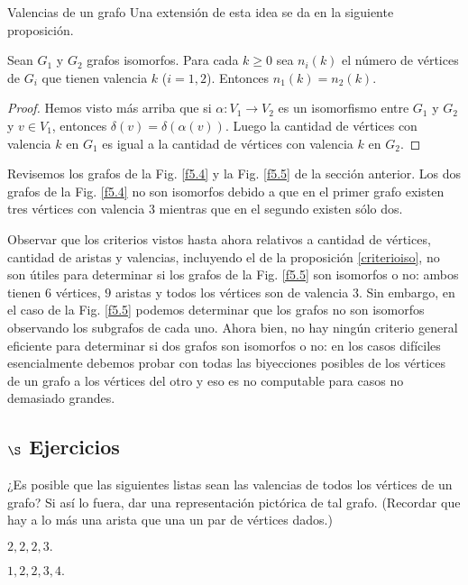 \begin{section}{Valencias de un grafo}
Una extensión de esta idea se da en la siguiente proposición.

\begin{proposicion}\label{criterioiso}Sean  $G_1$ y $G_2$ grafos isomorfos. Para cada $k\ge 0$ sea $n_i(k)$ el número de vértices de $G_i$ que tienen valencia $k$ ($i=1,2$). Entonces $n_1(k)=n_2(k)$.
\end{proposicion}
\begin{proof} Hemos visto más arriba que si $\alpha:V_1 \to  V_2$ es un isomorfismo entre $G_1$ y $G_2$ y $v\in V_1$, entonces $\delta(v)=\delta(\alpha(v))$. Luego la cantidad de vértices con valencia $k$ en $G_1$ es igual  a la cantidad de vértices con valencia $k$ en $G_2$.     
\end{proof}

\begin{ejemplo*} Revisemos los grafos de la Fig. \ref{f5.4} y la Fig. \ref{f5.5} de la sección anterior.  Los dos grafos de la Fig. \ref{f5.4}  no son isomorfos debido a que en el primer grafo existen tres vértices con valencia $3$ mientras que en el segundo existen sólo dos.

Observar que los criterios vistos hasta ahora relativos a cantidad de vértices,  cantidad de aristas y valencias, incluyendo el de la proposición \ref{criterioiso}, no son útiles para determinar si los grafos de  la Fig. \ref{f5.5} son isomorfos o no: ambos tienen $6$ vértices, $9$ aristas y todos los vértices son de valencia $3$. Sin embargo, en el caso de la Fig. \ref{f5.5} podemos determinar que los grafos no son isomorfos observando los subgrafos de cada uno. Ahora bien, no  hay ningún criterio general eficiente para determinar si dos grafos son isomorfos o no: en los casos difíciles esencialmente debemos probar con todas las biyecciones posibles de los vértices de un grafo a los vértices del otro y eso es no computable para casos no demasiado  grandes.   
\end{ejemplo*}

\subsection*{$\S$ Ejercicios}\label{ejercicios5.3}
\begin{enumex}
\item ¿Es posible que las siguientes listas sean las valencias de todos los vértices de un grafo? Si así lo fuera, dar una representación pictórica de tal grafo. (Recordar que hay a lo más una arista que una un par de
vértices dados.)
    \begin{enumex}
        \begin{minipage}{0.4\textwidth}
            \item $2,2,2,3.$
        \end{minipage}
        \begin{minipage}{0.4\textwidth}
            \item $1,2,2,3,4.$
        \end{minipage}


\end{enumex}
\end{enumex}
\end{section}
